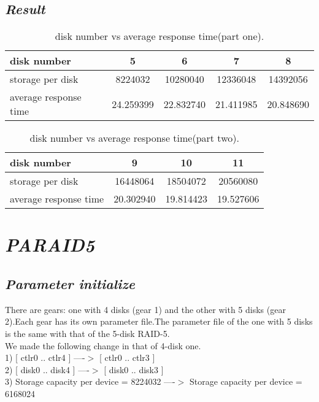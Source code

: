\documentclass[conference]{IEEEtran}
\begin{document}
\subsection{\emph{\textbf{Result}}}
\begin{table}[H]
\centering
\begin{tabular}{lcccc}  %
\hline
disk number           &5         &6         &7         &8     \\ \hline  %
storage per disk      &8224032   &10280040  &12336048  &14392056\\ \hline        %
average response time &24.259399 &22.832740 &21.411985 &20.848690\\ \hline       %
\end{tabular}
\caption{disk number vs average response time(part one).}
\end{table}

\begin{table}[H]
\centering
\begin{tabular}{lccc}  %
\hline
disk number           &9         &10        &11          \\ \hline  %
storage per disk      &16448064  &18504072  &20560080  \\ \hline        %
average response time &20.302940 &19.814423 &19.527606 \\ \hline       %
\end{tabular}
\caption{disk number vs average response time(part two).}
\end{table}

\section{\emph{\textbf{PARAID5}}}
\subsection{\emph{\textbf{Parameter initialize}}}
There are gears: one with 4 disks (gear 1) and the other with 5 disks (gear 2).Each gear has its own parameter file.The parameter file of the one with 5 disks is the same with that of the 5-disk RAID-5.\\
We made the following change in that of 4-disk one.\\
1)  [ ctlr0 .. ctlr4 ] ----$>$  [ ctlr0 .. ctlr3 ]\\
2) [ disk0 .. disk4 ] ----$>$ [ disk0 .. disk3 ]\\
3) Storage capacity per device  =  8224032  ----$>$ Storage capacity per device  =  6168024\\
\end{document}
